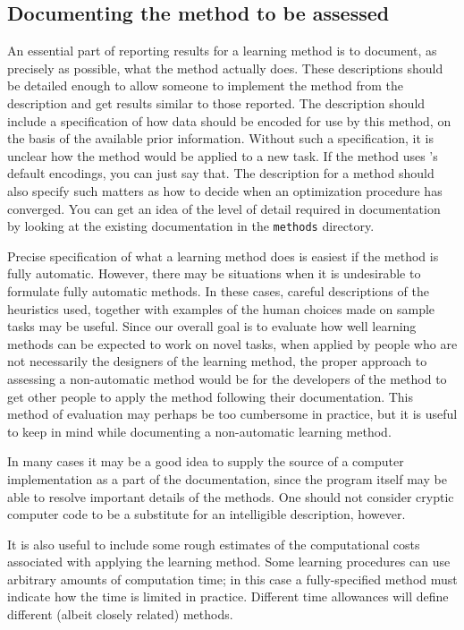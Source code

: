 \subsection{Documenting the method to be assessed}\label{assess-define}

An essential part of reporting results for a learning method is to
document, as precisely as possible, what the method actually
does. These descriptions should be detailed enough to allow someone to
implement the method from the description and get results similar to
those reported.  The description should include a specification of how
data should be encoded for use by this method, on the basis of the
available prior information.  Without such a specification, it is
unclear how the method would be applied to a new task.  If the method
uses \delve{}'s default encodings, you can just say that.  The
description for a method should also specify such matters as how to
decide when an optimization procedure has converged.  You can get an
idea of the level of detail required in documentation by looking at
the existing documentation in the \texttt{methods} directory.

Precise specification of what a learning method does is easiest if the
method is fully automatic. However, there may be situations when it is
undesirable to formulate fully automatic methods. In these cases,
careful descriptions of the heuristics used, together with examples of
the human choices made on sample tasks may be useful.  Since our
overall goal is to evaluate how well learning methods can be expected
to work on novel tasks, when applied by people who are not necessarily
the designers of the learning method, the proper approach to assessing
a non-automatic method would be for the developers of the method to
get other people to apply the method following their
documentation. This method of evaluation may perhaps be too cumbersome
in practice, but it is useful to keep in mind while documenting a
non-automatic learning method.

In many cases it may be a good idea to supply the source of a computer
implementation as a part of the documentation, since the program
itself may be able to resolve important details of the methods. One
should not consider cryptic computer code to be a substitute for an
intelligible description, however.

It is also useful to include some rough estimates of the computational
costs associated with applying the learning method.  Some learning
procedures can use arbitrary amounts of computation time; in this case
a fully-specified method must indicate how the time is limited in
practice.  Different time allowances will define different (albeit
closely related) methods.

